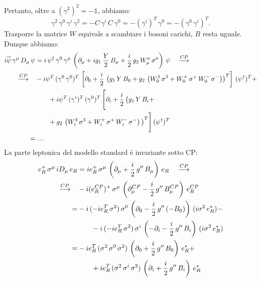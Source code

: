 Pertanto, oltre a $(\gamma^2)^2 = -\mathbb{1}$, abbiamo:
\begin{equation}
    \gamma^2\, \gamma^0\, \gamma^i\, \gamma^2 = -C\, \gamma^i\, C\, \gamma^0 = -(\gamma^i)^T\, \gamma^0 = -(\gamma^0\, \gamma^i)^T.
\end{equation}
Trasporre la matrice $W$ equivale a scambiare i bosoni carichi, $B$ resta uguale. Dunque abbiamo:
\begin{align}
    i\overline{\psi}\, \gamma^\mu\, D_\mu\, \psi &= i\, \psi^\dagger\, \gamma^0\, \gamma^\mu\, \left( \partial_\mu + ig_1\, \frac{Y}{2}\, B_\mu + \frac{i}{2}\, g_2\, W_\mu^a\, \sigma^a \right)\, \psi \quad \overset{CP}{\longrightarrow}\quad \\
    \overset{CP}{\longrightarrow}\quad &-i\psi^T\, (\gamma^0\, \gamma^0)^T\, \left[ \partial_0 + \frac{i}{2}\, \left( g_1\, Y\, B_0 + g_2\, \left( W_0^3\, \sigma^3 + W_0^+\, \sigma^+\, W_0^-\, \sigma^- \right) \right)^T \right]\, (\psi^\dagger)^T + \notag \\
    &\qquad + i\psi^T\, (\gamma^i)^T\, (\gamma^0)^T\, \Bigg[ \partial_i + \frac{i}{2}\, \big( g_1\, Y\, B_i + \notag \\
    &\qquad + g_2\, \left( W_i^3\, \sigma^3 + W_i^+\, \sigma^+\, W_i^-\, \sigma^- \right) \big)^T \Bigg]\, (\psi^\dagger)^T \\
    =& \dots
\end{align}
La parte leptonica del modello standard è invariante sotto CP:
\begin{align}
    e_R^+\, \sigma^\mu\, iD_\mu\, e_R &= ie_R^+\, \sigma^\mu\, \left(\partial_\mu + \frac{i}{2}\, g^{\prime\prime}\, B_\mu\right)\, e_R \quad \overset{CP}{\longrightarrow}\quad \\
    \overset{CP}{\longrightarrow}\quad &-i(e_R^{CP})^+\, \sigma^\mu\, \left( \partial_\mu^{CP} - \frac{i}{2}\, g^{\prime\prime}\, B_\mu^{CP} \right)\, e_R^{CP} \\
    =& -i\, (-ie_R^T\, \sigma^2)\, \sigma^0\, \left( \partial_0 - \frac{i}{2}\, g^{\prime\prime}\, (-B_0) \right)\,  (i\sigma^2\, e_R^*) - \notag \\
    &\qquad - i\, (-ie_R^T\, \sigma^2)\, \sigma^i\, \left( -\partial_i - \frac{i}{2}\, g^{\prime\prime}\, B_i \right)\,  (i\sigma^2\, e_R^*) \\
    =& -ie_R^T\, (\sigma^2\, \sigma^0\, \sigma^2)\, \left( \partial_0 + \frac{i}{2}\, g^{\prime\prime}\, B_0 \right)\, e_R^* + \notag \\
    &\qquad + ie_R^T\, (\sigma^2\, \sigma^i\, \sigma^2)\, \left(\partial_i + \frac{i}{2}\, g^{\prime\prime}\, B_i\right)\, e_R^*
\end{align}

